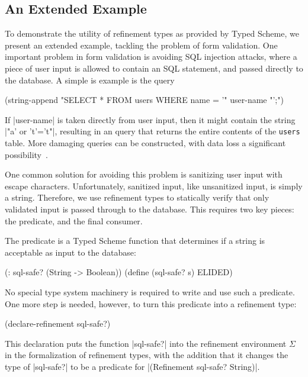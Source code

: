 \begin{schemeregion}

\section{An Extended Example}

To demonstrate the utility of refinement types as provided by Typed
Scheme,
 we present an extended example, tackling the problem of form
validation.  One important problem in form validation is avoiding SQL
injection attacks, where a piece of user input is allowed to contain
an SQL statement, and passed directly to the database.  A simple is
example is the query

\begin{schemedisplay}
(string-append "SELECT * FROM users WHERE name = '" user-name "';")
\end{schemedisplay}
\noindent
If \scheme|user-name| is taken directly from user input, then it might
contain the string \scheme|"a' or 't'='t"|, resulting in an query that
returns the entire contents of the \verb|users| table.  More damaging
queries can be constructed, with data loss a significant
possibility~\cite{xkcd}.  

One common solution for avoiding this problem is sanitizing user input
with escape characters.  Unfortunately, sanitized input, like
unsanitized input, is simply a string.  Therefore, we use
refinement types to statically verify that only validated input
 is passed through to the database.  This requires two key
pieces: the predicate, and the final consumer.

The predicate is a Typed Scheme function that determines if a
string is acceptable as input to the database:

\begin{schemedisplay}
(: sql-safe? (String -> Boolean))
(define (sql-safe? s) ELIDED)
\end{schemedisplay}  

No special type system machinery is required to write and use such a
predicate.  One more step is needed, however, to turn this predicate
into a refinement type:

\begin{schemedisplay}
(declare-refinement sql-safe?)
\end{schemedisplay}

\noindent
This declaration puts the function \scheme|sql-safe?| 
into the refinement environment $\Sigma$ in the formalization of refinement types,
with the addition that it changes the type of \scheme|sql-safe?| to be
a predicate for \scheme|(Refinement sql-safe? String)|.  


\end{schemeregion}
